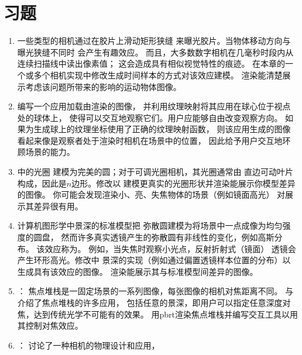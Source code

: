 \section{习题}\label{sec:习题06}
\begin{enumerate}
      \item \circletwo 一些类型的相机通过在胶片上滑动矩形狭缝
      来曝光胶片。当物体移动方向与曝光狭缝不同时
      会产生有趣效应\citep{761554,10.1080/2151237X.2007.10129235}。
      而且，大多数数字相机在几毫秒时段内从连续扫描线中读出像素值；
      这会造成具有相似视觉特性的痕迹。
      在本章的一个或多个相机实现中修改生成时间样本的方式对该效应建模。
      渲染能清楚展示考虑该问题所带来的影响的运动物体图像。
      \item \circletwo 编写一个应用加载由渲染的图像，
      并利用纹理映射将其应用在球心位于视点处的球体上，
      使得可以交互地观察它们。用户应能够自由改变观察方向。
      如果为生成球上的纹理坐标使用了正确的纹理映射函数，
      则该应用生成的图像看起来像是观察者处于渲染时相机在场景中的位置，
      因此给予用户交互地环顾场景的能力。
      \item \circletwo {}中的光圈
      建模为完美的圆；对于可调光圈相机，其光圈通常由
      直边可动叶片构成，因此是$n$边形。修改以
      建模更真实的光圈形状并渲染能展示你模型差异的图像。
      你可能会发现渲染小、亮、失焦物体的场景（例如镜面高光）
      对展示其差异很有用。
      \item \circletwo 计算机图形学中景深的标准模型把
      弥散圆建模为将场景中一点成像为均匀强度的圆盘，
      然而许多真实透镜产生的弥散圆有非线性的变化，例如高斯分布。
      该效应称为\citep{10.1145/1242073.1242155}。
      例如，当失焦时观察小光点，反射折射式（镜面）
      透镜会产生环形高光。修改中
      景深的实现（例如通过偏置透镜样本位置的分布）以生成具有该效应的图像。
      渲染能展示其与标准模型间差异的图像。
      \item \circletwo {}：
      焦点堆栈是一固定场景的一系列图像，每张图像的相机对焦距离不同。
      \citet{5740919}与\citet{Jacobs2012}介绍了焦点堆栈的许多应用，
      包括任意的景深，即用户可以指定任意深度对焦，达到传统光学不可能有的效果。
      用pbrt渲染焦点堆栈并编写交互工具以用其控制对焦效应。
      \item \circlethree {}：
      \citet{ng:hal-02551481}讨论了一种相机的物理设计和应用，

\end{enumerate}

